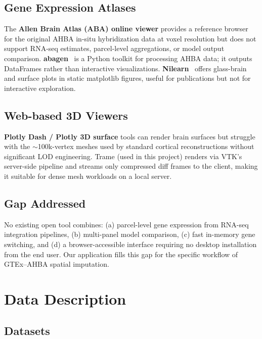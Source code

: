 \documentclass[11pt,letterpaper]{article}
\begin{document}
\subsection{Gene Expression Atlases}

The \textbf{Allen Brain Atlas (ABA) online viewer}
provides a reference browser for the original AHBA in-situ hybridization data
at voxel resolution but does not support RNA-seq estimates, parcel-level
aggregations, or model output comparison.
\textbf{abagen}~\citep{markello2021} is a Python toolkit for processing AHBA data;
it outputs DataFrames rather than interactive visualizations.
\textbf{Nilearn}~\citep{abraham2014} offers glass-brain and surface plots
in static matplotlib figures, useful for publications but not for interactive
exploration.

\subsection{Web-based 3D Viewers}

\textbf{Plotly Dash / Plotly 3D surface} tools can render brain surfaces
but struggle with the $\sim$100k-vertex meshes used by standard cortical
reconstructions without significant LOD engineering.
Trame (used in this project) renders via VTK's server-side pipeline and
streams only compressed diff frames to the client, making it suitable for
dense mesh workloads on a local server.

\subsection{Gap Addressed}

No existing open tool combines: (a) parcel-level gene expression from
RNA-seq integration pipelines, (b) multi-panel model comparison,
(c) fast in-memory gene switching, and (d) a browser-accessible interface
requiring no desktop installation from the end user.
Our application fills this gap for the specific workflow of GTEx--AHBA
spatial imputation.

\section{Data Description}
\label{sec:data}

\subsection{Datasets}
\end{document}
